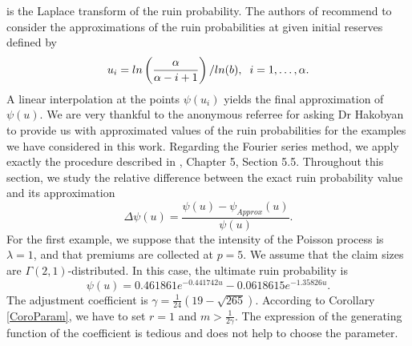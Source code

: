 is the Laplace transform of the ruin probability. The authors of \citet{MnSaHa14} recommend to consider the approximations of the ruin probabilities at given initial reserves defined by 
\begin{equation}
u_{i}=ln\left(\frac{\alpha}{\alpha-i+1}\right)/ln(b),\hspace{0.2cm}i=1,\ldots,\alpha.
\end{equation}
A linear interpolation at the points $\psi(u_{i})$ yields the final approximation of $\psi(u)$. We are very thankful to the anonymous referree for asking Dr Hakobyan to provide us with approximated values of the ruin probabilities for the examples we have considered in this work. Regarding the Fourier series method, we apply exactly the procedure described in \citet{RoScScTe99}, Chapter 5, Section 5.5. Throughout this section, we study  the relative difference between the exact ruin probability value and its approximation
\begin{equation}\label{RelativeErrorDefinition}
\Delta\psi(u)=\frac{\psi(u)-\psi_{Approx}(u)}{\psi(u)}.
\end{equation}
For the first example, we suppose that the intensity of the Poisson process is $\lambda=1$, and that premiums are collected at $p=5$. We assume that the claim sizes are $\Gamma(2,1)$-distributed. In this case, the ultimate ruin probability is 
\begin{equation*}\label{ExactRuinProbabilityGamma21}
\psi(u)=  0.461861 e^{-0.441742 u}-0.0618615 e^{-1.35826 u}.
\end{equation*}
The adjustment coefficient is $\gamma=\frac{1}{24}\left(19-\sqrt{265}\right)$. According to Corollary \ref{CoroParam}, we have to set $r=1$ and $m>\frac{1}{2\gamma}$. The expression of the generating function of the coefficient is tedious and does not help to choose the parameter.\\

